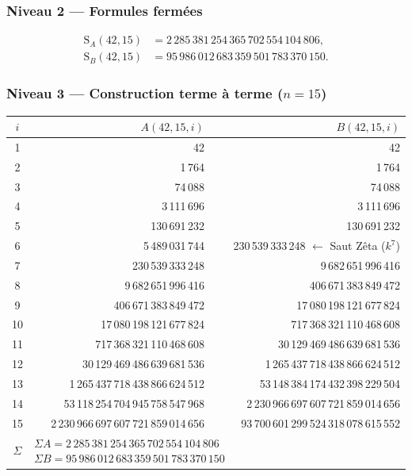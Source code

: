 \documentclass[11pt,a4paper]{article}
\newcommand{\SA}{\mathrm{S}_A}
\newcommand{\SB}{\mathrm{S}_B}
\begin{document}
\subsubsection{Niveau 2 --- Formules fermées}
\begin{align*}
\SA(42,15)&=2\,285\,381\,254\,365\,702\,554\,104\,806,\\
\SB(42,15)&=95\,986\,012\,683\,359\,501\,783\,370\,150.
\end{align*}

\subsubsection{Niveau 3 --- Construction terme à terme ($n = 15$)}

\begin{center}\small
\begin{tabular}{@{}c r r@{}}
\toprule
\rowcolor{spectralgris}
$i$ & $A(42,15,i)$ & $B(42,15,i)$ \\
\midrule
1 & 42 & 42 \\
2 & 1\,764 & 1\,764 \\
3 & 74\,088 & 74\,088 \\
4 & 3\,111\,696 & 3\,111\,696 \\
5 & 130\,691\,232 & 130\,691\,232 \\
6 & 5\,489\,031\,744 & 230\,539\,333\,248 \quad $\leftarrow$ Saut Zêta ($k^{7}$) \\
7 & 230\,539\,333\,248 & 9\,682\,651\,996\,416 \\
8 & 9\,682\,651\,996\,416 & 406\,671\,383\,849\,472 \\
9 & 406\,671\,383\,849\,472 & 17\,080\,198\,121\,677\,824 \\
10 & 17\,080\,198\,121\,677\,824 & 717\,368\,321\,110\,468\,608 \\
11 & 717\,368\,321\,110\,468\,608 & 30\,129\,469\,486\,639\,681\,536 \\
12 & 30\,129\,469\,486\,639\,681\,536 & 1\,265\,437\,718\,438\,866\,624\,512 \\
13 & 1\,265\,437\,718\,438\,866\,624\,512 & 53\,148\,384\,174\,432\,398\,229\,504 \\
14 & 53\,118\,254\,704\,945\,758\,547\,968 & 2\,230\,966\,697\,607\,721\,859\,014\,656 \\
15 & 2\,230\,966\,697\,607\,721\,859\,014\,656 & 93\,700\,601\,299\,524\,318\,078\,615\,552 \\
\midrule
$\Sigma$ & \multicolumn{2}{l}{$\Sigma A = 2\,285\,381\,254\,365\,702\,554\,104\,806$ \quad $\Sigma B = 95\,986\,012\,683\,359\,501\,783\,370\,150$} \\
\bottomrule
\end{tabular}
\end{center}
\end{document}
